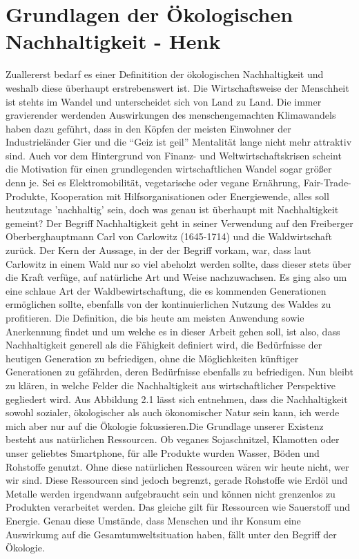\chapter{Grundlagen der Ökologischen Nachhaltigkeit - Henk}
Zuallererst bedarf es einer Definitition der ökologischen Nachhaltigkeit und weshalb diese überhaupt erstrebenswert ist. Die Wirtschaftsweise der Menschheit ist stehts im Wandel und unterscheidet sich von Land zu Land. Die immer gravierender werdenden Auswirkungen des menschengemachten Klimawandels haben dazu geführt, dass in den Köpfen der meisten Einwohner der Industrieländer Gier und die ``Geiz ist geil'' Mentalität lange nicht mehr attraktiv sind. Auch vor dem Hintergrund von Finanz- und Weltwirtschaftskrisen scheint die Motivation für einen grundlegenden wirtschaftlichen Wandel sogar größer denn je. Sei es Elektromobilität, vegetarische oder vegane Ernährung, Fair-Trade-Produkte, Kooperation mit Hilfsorganisationen oder Energiewende, alles soll heutzutage 'nachhaltig' sein, doch was genau ist überhaupt mit Nachhaltigkeit gemeint? \newline Der Begriff Nachhaltigkeit geht in seiner Verwendung auf den Freiberger Oberberghauptmann Carl von Carlowitz (1645-1714) und die Waldwirtschaft zurück\cite{doi:nachhaltig}. Der Kern der Aussage, in der der Begriff vorkam, war, dass laut Carlowitz in einem Wald nur so viel abeholzt werden sollte, dass dieser stets über die Kraft verfüge, auf natürliche Art und Weise nachzuwachsen. Es ging also um eine schlaue Art der Waldbewirtschaftung, die es kommenden Generationen ermöglichen sollte, ebenfalls von der kontinuierlichen Nutzung des Waldes zu profitieren. Die Definition, die bis heute am meisten Anwendung sowie Anerkennung findet und um welche es in dieser Arbeit gehen soll, ist also, dass Nachhaltigkeit generell als die Fähigkeit definiert wird, die Bedürfnisse der heutigen Generation zu befriedigen, ohne die Möglichkeiten künftiger Generationen zu gefährden, deren Bedürfnisse ebenfalls zu befriedigen. \clearpage Nun bleibt zu klären, in welche Felder die Nachhaltigkeit aus wirtschaftlicher Perspektive gegliedert wird. Aus Abbildung 2.1 lässt sich entnehmen, dass die Nachhaltigkeit sowohl sozialer, ökologischer als auch ökonomischer Natur sein kann, ich werde mich aber nur auf die Ökologie fokussieren.\newline Die Grundlage unserer Existenz besteht aus natürlichen Ressourcen. Ob veganes Sojaschnitzel, Klamotten oder unser geliebtes Smartphone, für alle Produkte wurden Wasser, Böden und Rohstoffe genutzt. Ohne diese natürlichen Ressourcen wären wir heute nicht, wer wir sind. Diese Ressourcen sind jedoch begrenzt, gerade Rohstoffe wie Erdöl und Metalle werden irgendwann aufgebraucht sein und können nicht grenzenlos zu Produkten verarbeitet werden. Das gleiche gilt für Ressourcen wie Sauerstoff und Energie. Genau diese Umstände, dass Menschen und ihr Konsum eine Auswirkumg auf die Gesamtumweltsituation haben, fällt unter den Begriff der Ökologie. 
